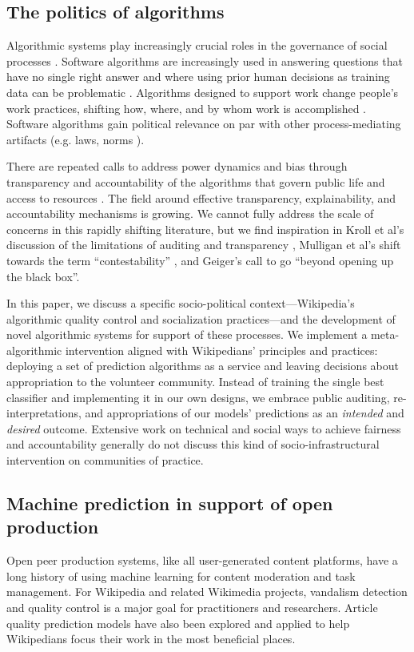 \subsection{The politics of algorithms}
Algorithmic systems play increasingly crucial roles in the governance of social processes \cite{gillespie2014relevance}. Software algorithms are increasingly used in answering questions that have no single right answer and where using prior human decisions as training data can be problematic \cite{barocas2013governing}. Algorithms designed to support work change people's work practices, shifting how, where, and by whom work is accomplished \cite{crawford2016algorithm, zuboff1988age}. Software algorithms gain political relevance on par with other process-mediating artifacts (e.g. laws, norms \cite{lessig1999code}).

There are repeated calls to address power dynamics and bias through transparency and accountability of the algorithms that govern public life and access to resources \cite{diakopoulos2017algorithmic,sandvig2014auditing}. The field around effective transparency, explainability, and accountability mechanisms is growing. We cannot fully address the scale of concerns in this rapidly shifting literature, but we find inspiration in Kroll et al's discussion of the limitations of auditing and transparency \cite{kroll2016accountable}, Mulligan et al's shift towards the term ``contestability'' \cite{mulligan2019shaping}, and Geiger's call to go ``beyond opening up the black box\cite{geiger2017beyond}''.

In this paper, we discuss a specific socio-political context---Wikipedia's algorithmic quality control and socialization practices---and the development of novel algorithmic systems for support of these processes.  We implement a meta-algorithmic intervention aligned with Wikipedians' principles and practices: deploying a set of prediction algorithms as a service and leaving decisions about appropriation to the volunteer community.  Instead of training the single best classifier and implementing it in our own designs, we embrace public auditing, re-interpretations, and appropriations of our models' predictions as an \emph{intended} and \emph{desired} outcome.  Extensive work on technical and social ways to achieve fairness and accountability generally do not discuss this kind of socio-infrastructural intervention on communities of practice.

\subsection{Machine prediction in support of open production}
Open peer production systems, like all user-generated content platforms, have a long history of using machine learning for content moderation and task management. For Wikipedia and related Wikimedia projects, vandalism detection and quality control is a major goal for practitioners and researchers.  Article quality prediction models have also been explored and applied to help Wikipedians focus their work in the most beneficial places.

